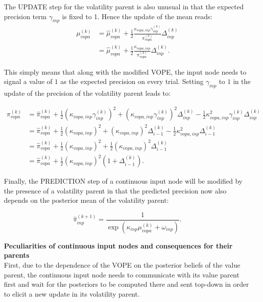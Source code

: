 The \textsf{UPDATE step} for the volatility parent is also unusual in that the expected precision term $\gamma_{inp}$ is fixed to 1. Hence the update of the mean reads:
\begin{align}
	\mu_{vopa}^{(k)} &= \hat{\mu}_{vopa}^{(k)} 
			+ \frac{1}{2} \frac{\kappa_{vopa,inp} \gamma_{inp}^{(k)}}{\pi_{vopa}^{(k)}} \Delta_{inp}^{(k)}\\
			&= \hat{\mu}_{vopa}^{(k)} 
			+ \frac{1}{2} \frac{\kappa_{vopa,inp}}{\pi_{vopa}^{(k)}} \Delta_{inp}^{(k)}.
\end{align}

This simply means that along with the modified \textsf{VOPE}, the input node needs to signal a value of $1$ as the expected precision on every trial. Setting $\gamma_{inp}$ to $1$ in the update of the precision of the volatility parent leads to:

\begin{align}
	\pi_{vopa}^{(k)} &= \hat{\pi}_{vopa}^{(k)} 
			+ \frac{1}{2} (\kappa_{vopa,inp} \gamma_{inp}^{(k)})^2 
			+ (\kappa_{vopa,inp} \gamma_{inp}^{(k)})^2 \Delta_{inp}^{(k)} 
			- \frac{1}{2} \kappa_{vopa,inp}^2 \gamma_{inp}^{(k)} \Delta_{inp}^{(k)}\\
			&= \hat{\pi}_{vopa}^{(k)} 
			+ \frac{1}{2} (\kappa_{vopa,inp})^2 
			+ (\kappa_{vopa,inp})^2 \Delta_{i-1}^{(k)} 
			- \frac{1}{2} \kappa_{vopa,inp}^2 \Delta_{i-1}^{(k)}\\
			&= \hat{\pi}_{vopa}^{(k)} 
			+ \frac{1}{2} (\kappa_{vopa,inp})^2 
			+ \frac{1}{2} (\kappa_{vopa,inp})^2 \Delta_{i-1}^{(k)}\\
			&= \hat{\pi}_{vopa}^{(k)} 
			+ \frac{1}{2} (\kappa_{vopa,inp})^2 (1 + \Delta_{i-1}^{(k)}).
\end{align}

Finally, the \textsf{PREDICTION step} of a continuous input node will be modified by the presence of a volatility parent in that the predicted precision now also depends on the posterior mean of the volatility parent:

\begin{equation}
	\hat{\pi}_{inp}^{(k+1)} = \frac{1}{\exp(\kappa_{inp} \mu_{vopa}^{(k)} + \omega_{inp})}.
\end{equation}

\textbf{Peculiarities of continuous input nodes and consequences for their parents}\\
First, due to the dependence of the \textsf{VOPE} on the posterior beliefs of the value parent, the continuous input node needs to communicate with its value parent first and wait for the posteriors to be computed there and sent top-down in order to elicit a new update in its volatility parent.\\


